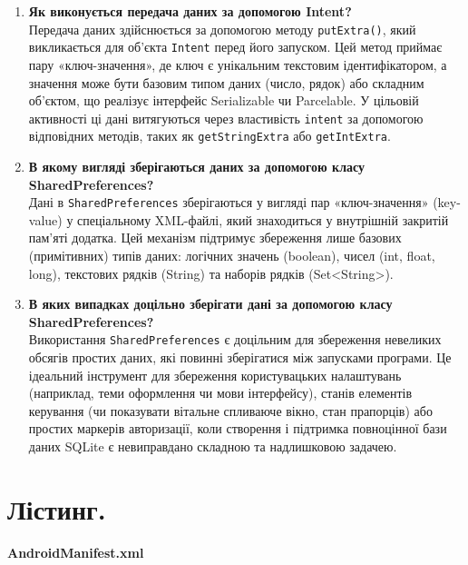 \documentclass[14pt, a4paper]{extreport}
\begin{document}
\begin{enumerate}
		\item \textbf{Як виконується передача даних за допомогою Intent?} \\ Передача даних здійснюється за допомогою методу \texttt{putExtra()}, який викликається для об'єкта \texttt{Intent} перед його запуском. Цей метод приймає пару «ключ-значення», де ключ є унікальним текстовим ідентифікатором, а значення може бути базовим типом даних (число, рядок) або складним об'єктом, що реалізує інтерфейс Serializable чи Parcelable. У цільовій активності ці дані витягуються через властивість \texttt{intent} за допомогою відповідних методів, таких як \texttt{getStringExtra} або \texttt{getIntExtra}.
		
		\item \textbf{В якому вигляді зберігаються даних за допомогою класу SharedPreferences?} \\ Дані в \texttt{SharedPreferences} зберігаються у вигляді пар «ключ-значення» (key-value) у спеціальному XML-файлі, який знаходиться у внутрішній закритій пам'яті додатка. Цей механізм підтримує збереження лише базових (примітивних) типів даних: логічних значень (boolean), чисел (int, float, long), текстових рядків (String) та наборів рядків (Set<String>).
		
		\item \textbf{В яких випадках доцільно зберігати дані за допомогою класу SharedPreferences?} \\ Використання \texttt{SharedPreferences} є доцільним для збереження невеликих обсягів простих даних, які повинні зберігатися між запусками програми. Це ідеальний інструмент для збереження користувацьких налаштувань (наприклад, теми оформлення чи мови інтерфейсу), станів елементів керування (чи показувати вітальне спливаюче вікно, стан прапорців) або простих маркерів авторизації, коли створення і підтримка повноцінної бази даних SQLite є невиправдано складною та надлишковою задачею.
	\end{enumerate}
	
	\pagebreak
	
	\section*{Лістинг.}
	
	\textbf{AndroidManifest.xml}
	
\end{document}
